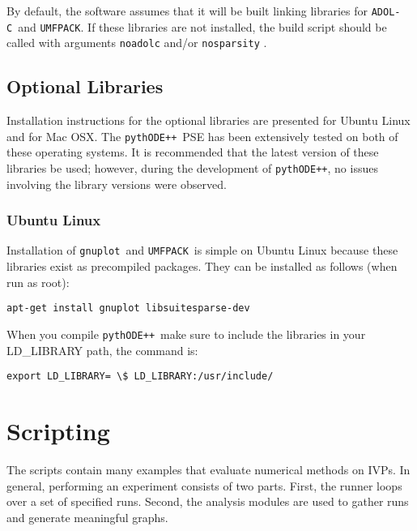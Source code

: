 \documentclass[11pt]{article}
\newcommand{\pypp}{\texttt{pythODE++}}
\newcommand{\adolc}{\texttt{ADOL-C}}
\newcommand{\umfpack}{\texttt{UMFPACK}}
\newcommand{\gnuplot}{\texttt{gnuplot}}
\begin{document}
By default, the software assumes that it will be built linking
libraries for \adolc\ and \umfpack. If these libraries are not
installed, the build script should be called with arguments
\verb=noadolc= and/or \verb=nosparsity= .

\subsection{Optional Libraries}

Installation instructions for the optional libraries are presented for Ubuntu Linux and for Mac OSX. The \pypp\ PSE has been extensively tested on both of these operating systems. It is recommended that the latest version of these libraries be used; however, during the development of \pypp, no issues involving the library versions were observed.

\subsubsection{Ubuntu Linux}

Installation of \gnuplot\ and \umfpack\ is simple on Ubuntu Linux because these libraries exist as precompiled packages. They can be installed as follows (when run as root):
\begin{verbatim}
apt-get install gnuplot libsuitesparse-dev
\end{verbatim}

When you compile \pypp\ make sure to include the libraries in your LD\_LIBRARY path, the command is:
\begin{verbatim} 
export LD_LIBRARY= \$ LD_LIBRARY:/usr/include/
\end{verbatim}

\section{Scripting}

The scripts contain many examples that evaluate numerical methods on
IVPs. In general, performing an experiment consists of two
parts. First, the runner loops over a set of specified runs. Second,
the analysis modules are used to gather runs and generate
meaningful graphs.
\end{document}
